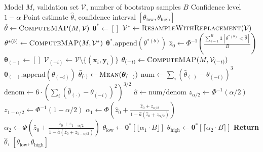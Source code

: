 \begin{algorithm}[H]
\caption{Bootstrap Confidence Interval Computation}
\label{alg:bootstrap_ci}
\begin{algorithmic}[1]
\Require Model $M$, validation set $\mathcal{V}$, number of bootstrap samples $B$
\Require Confidence level $1 - \alpha$
\Ensure Point estimate $\hat{\theta}$, confidence interval $[\theta_{\text{low}}, \theta_{\text{high}}]$
\State $\hat{\theta} \gets \Call{ComputeMAP}{M, \mathcal{V}}$ 
\State $\boldsymbol{\theta}^* \gets []$ 
    \State $\mathcal{V}^* \gets \Call{ResampleWithReplacement}{\mathcal{V}}$
    \State $\theta^{*(b)} \gets \Call{ComputeMAP}{M, \mathcal{V}^*}$
    \State $\boldsymbol{\theta}^*.\text{append}(\theta^{*(b)})$
\EndFor
\State {}
\State $\hat{z}_0 \gets \Phi^{-1}\left(\frac{\sum_{b=1}^{B} \mathbf{1}[\theta^{*(b)} < \hat{\theta}]}{B}\right)$
\State {}
\State $\boldsymbol{\theta}_{(-)} \gets []$
    \State $\mathcal{V}_{(-i)} \gets \mathcal{V} \setminus \{(\mathbf{x}_i, \mathbf{y}_i)\}$
    \State $\theta_{(-i)} \gets \Call{ComputeMAP}{M, \mathcal{V}_{(-i)}}$
    \State $\boldsymbol{\theta}_{(-)}.\text{append}(\theta_{(-i)})$
\EndFor
\State $\bar{\theta}_{(\cdot)} \gets \Call{Mean}{\boldsymbol{\theta}_{(-)}}$
\State $\text{num} \gets \sum_{i} (\bar{\theta}_{(\cdot)} - \theta_{(-i)})^3$
\State $\text{denom} \gets 6 \cdot \left(\sum_{i} (\bar{\theta}_{(\cdot)} - \theta_{(-i)})^2\right)^{3/2}$
\State $\hat{a} \gets \text{num} / \text{denom}$
\State {}
\State $z_{\alpha/2} \gets \Phi^{-1}(\alpha/2)$
\State $z_{1-\alpha/2} \gets \Phi^{-1}(1 - \alpha/2)$
\State $\alpha_1 \gets \Phi\left(\hat{z}_0 + \frac{\hat{z}_0 + z_{\alpha/2}}{1 - \hat{a}(\hat{z}_0 + z_{\alpha/2})}\right)$
\State $\alpha_2 \gets \Phi\left(\hat{z}_0 + \frac{\hat{z}_0 + z_{1-\alpha/2}}{1 - \hat{a}(\hat{z}_0 + z_{1-\alpha/2})}\right)$
\State {}
\State {}
\State $\theta_{\text{low}} \gets \boldsymbol{\theta}^*[\lfloor \alpha_1 \cdot B \rfloor]$
\State $\theta_{\text{high}} \gets \boldsymbol{\theta}^*[\lceil \alpha_2 \cdot B \rceil]$
\State \textbf{Return} $\hat{\theta}$, $[\theta_{\text{low}}, \theta_{\text{high}}]$
\end{algorithmic}
\end{algorithm}

